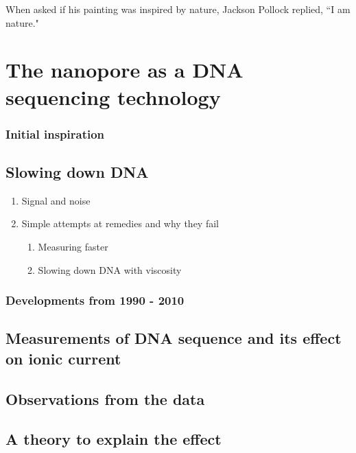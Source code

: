 \begin{savequote}[75mm]
When asked if his painting was inspired by nature, Jackson Pollock replied, ``I am nature."
\end{savequote}

\chapter{The nanopore as a DNA sequencing technology}
\label{dna_sequencing}

\subsection{Initial inspiration}

\section{Slowing down DNA}
\begin{enumerate}
\item Signal and noise
\item Simple attempts at remedies and why they fail
\begin{enumerate}
\item Measuring faster
\item Slowing down DNA with viscosity
\end{enumerate}
\end{enumerate}

\subsection{Developments from 1990 - 2010}

\section{Measurements of DNA sequence and its effect on ionic current}

\section{Observations from the data}

\section{A theory to explain the effect}
